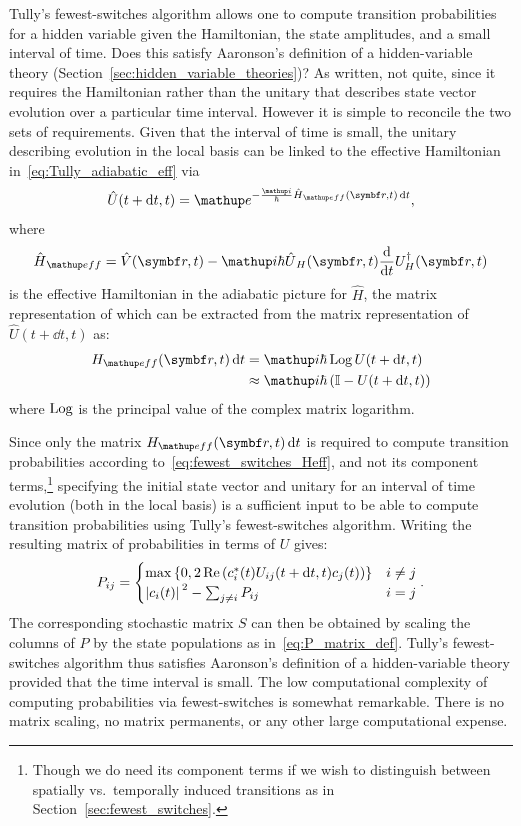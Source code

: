 Tully's fewest-switches algorithm allows one to compute transition probabilities for a hidden variable given the Hamiltonian, the state amplitudes, and a small interval of time. Does this satisfy Aaronson's definition of a hidden-variable theory (Section~\ref{sec:hidden_variable_theories})? As written, not quite, since it requires the Hamiltonian rather than the unitary that describes state vector evolution over a particular time interval. However it is simple to reconcile the two sets of requirements. Given that the interval of time is small, the unitary describing evolution in the local basis can be linked to the effective Hamiltonian in~\eqref{eq:Tully_adiabatic_eff} via
\begin{align}
\hat U(t+\dd t, t) = \ee^{-\frac\ii\hbar\hat H_\up{eff}(\vec r, t)\,\dd t},
\end{align}
where
\begin{align}
\hat H_\up{eff} = \hat V(\vec r, t)
  - \ii\hbar\hat U_H(\vec r, t)\dv{t}U^\dagger_H(\vec r, t)
\end{align}
is the effective Hamiltonian in the adiabatic picture for $\hat H$, the matrix representation of which can be extracted from the matrix representation of $\hat U(t+\dd t, t)$ as:
\begin{align}
H_\up{eff}(\vec r, t)\,\dd t &= \ii\hbar\Log U(t+\dd t, t)\\
&\approx \ii\hbar\left(\mathbb{I} -  U(t+\dd t, t)\right)
\end{align}
where $\operatorname{Log}$ is the principal value of the complex matrix logarithm.

Since only the matrix $H_\up{eff}(\vec r, t)\,\dd t$ is required to compute transition probabilities according to~\eqref{eq:fewest_switches_Heff}, and not its component terms,\footnote{Though we do need its component terms if we wish to distinguish between spatially vs.\ temporally induced transitions as in Section~\ref{sec:fewest_switches}.} specifying the initial state vector and unitary for an interval of time evolution (both in the local basis) is a sufficient input to be able to compute transition probabilities using Tully's fewest-switches algorithm. Writing the resulting matrix of probabilities in terms of $U$ gives:
\begin{align}
P_{ij} = \begin{cases}
\max\left\{0, 2\re\left(c_i^*(t)U_{ij}(t + \dd t, t)c_j(t)\right)\right\} & i \neq j\\
\abs{c_i(t)}^2 - \sum_{j\neq i} P_{ij} & i = j
\end{cases}.
\end{align}
The corresponding stochastic matrix $S$ can then be obtained by scaling the columns of $P$ by the state populations as in~\eqref{eq:P_matrix_def}. Tully's fewest-switches algorithm thus satisfies Aaronson's definition of a hidden-variable theory provided that the time interval is small. The low computational complexity of computing probabilities via fewest-switches is somewhat remarkable. There is no matrix scaling, no matrix permanents, or any other large computational expense.

